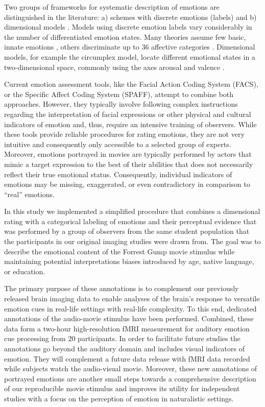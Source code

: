 Two groups of frameworks for systematic description of emotions are
distinguished in the literature: a) schemes with discrete emotions (labels) and
b) dimensional models \cite{GW2007}.  Models using discrete emotion labels vary
considerably in the number of differentiated emotion states. Many theories
assume few basic, innate emotions \cite{Ekm1992a}, others discriminate up to
36 affective categories \cite{Sch2005}.  Dimensional models, for example the
circumplex model, locate different emotional states in a two-dimensional
space, commonly using the axes arousal and valence \cite{Rus1980}.

Current emotion assessment tools, like the Facial Action Coding System (FACS),
or the Specific Affect Coding System (SPAFF)\cite{CG2007}, attempt to combine
both approaches. However, they typically involve following complex instructions
regarding the interpretation of facial expressions or other physical and
cultural indicators of emotion\cite[p. 281]{CG2007} and, thus, require an
intensive training of observers. While these tools provide reliable procedures
for rating emotions, they are not very intuitive and consequently only
accessible to a selected group of experts. Moreover, emotions portrayed in
movies are typically performed by actors that mimic a target expression to the
best of their abilities that does not necessarily reflect their true emotional
status.  Consequently, individual indicators of emotions may be missing,
exaggerated, or even contradictory in comparison to ``real'' emotions.

In this study we implemented a simplified procedure that combines a dimensional
rating with a categorical labeling of emotions and their perceptual evidence
that was performed by a group of observers from the same student population
that the participants in our original imaging studies were drawn
from\cite{HBI+14}.  The goal was to describe the emotional content of the
Forrest Gump movie stimulus while maintaining potential interpretations biases
introduced by age, native language, or education.

The primary purpose of these annotations is to complement our previously
released brain imaging data to enable analyses of the brain's response to
versatile emotion cues in real-life settings with real-life complexity. To this
end, dedicated annotations of the audio-movie stimulus have been performed.
Combined, these data form a two-hour high-resolution fMRI measurement for
auditory emotion cue processing from 20 participants. In order to facilitate
future studies the annotations go beyond the auditory domain and includes
visual indicators of emotion. They will complement a future data release with
fMRI data recorded while subjects watch the audio-visual movie.  Moreover,
these new annotations of portrayed emotions are another small steps towards a
comprehensive description of our reproducible movie stimulus\cite{HBI+14} and
improves its utility for independent studies with a focus on the perception of
emotion in naturalistic settings.


